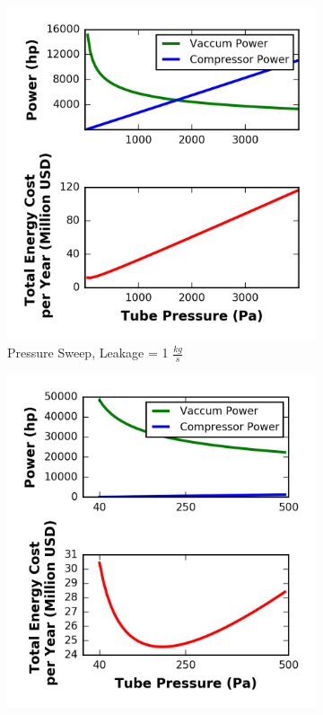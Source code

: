 \begin{figure}
\centering
\begin{subfigure}{.5\textwidth}
  \centering
  \includegraphics{../../images/graphs/pressure_trades/pressure_vs_power.png}
  \caption{Pressure Sweep, Leakage = 1 $\frac{kg}{s}$}
  \label{fig:pow_demands_vs_tube_press_big}
\end{subfigure}%
\begin{subfigure}{.5\textwidth}
  \centering
  \includegraphics{../../images/graphs/pressure_trades/pressure_vs_power_zoom.png}

\end{subfigure}
\end{figure}
